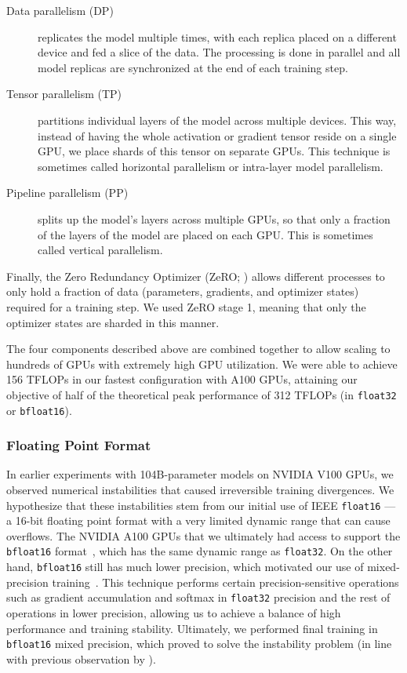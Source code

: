 \documentclass[twoside,11pt]{article}
\begin{document}
\begin{description}
\item[Data parallelism (DP)] replicates the model multiple times, with each replica placed on a different device and fed a slice of the data. The processing is done in parallel and all model replicas are synchronized at the end of each training step.
\item[Tensor parallelism (TP)] partitions individual layers of the model across multiple devices. This way, instead of having the whole activation or gradient tensor reside on a single GPU, we place shards of this tensor on separate GPUs. This technique is sometimes called horizontal parallelism or intra-layer model parallelism.
\item[Pipeline parallelism (PP)] splits up the model's layers across multiple GPUs, so that only a fraction of the layers of the model are placed on each GPU. This is sometimes called vertical parallelism.
\end{description}
Finally, the Zero Redundancy Optimizer (ZeRO; \citealp{rajbhandari2020zero}) allows different processes to only hold a fraction of data (parameters, gradients, and optimizer states) required for a training step. We used ZeRO stage 1, meaning that only the optimizer states are sharded in this manner.

The four components described above are combined together to allow scaling to hundreds of GPUs with extremely high GPU utilization. We were able to achieve 156 TFLOPs in our fastest configuration with A100 GPUs, attaining our objective of half of the theoretical peak performance of 312 TFLOPs (in \texttt{float32} or \texttt{bfloat16}).

\subsubsection{Floating Point Format}

In earlier experiments with 104B-parameter models on NVIDIA V100 GPUs, we observed numerical instabilities that caused irreversible training divergences.
We hypothesize that these instabilities stem from our initial use of IEEE \texttt{float16} --- a 16-bit floating point format with a very limited dynamic range that can cause overflows.
The NVIDIA A100 GPUs that we ultimately had access to support the \texttt{bfloat16} format~\citep{bf16blog,kalamkar2019study}, which has the same dynamic range as \texttt{float32}.
On the other hand, \texttt{bfloat16} still has much lower precision, which motivated our use of mixed-precision training~\citep{micikevicius2018mixed}. This technique performs certain precision-sensitive operations such as gradient accumulation and softmax in \texttt{float32} precision and the rest of operations in lower precision, allowing us to achieve a balance of high performance and training stability.
Ultimately, we performed final training in \texttt{bfloat16} mixed precision, which proved to solve the instability problem (in line with previous observation by \citealp{smith2022using}).
\end{document}
